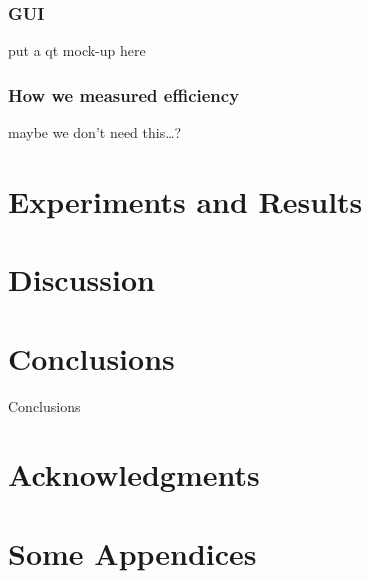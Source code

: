 \documentclass{sig-alternate-05-2015}
\begin{document}
\subsubsection{GUI}
put a qt mock-up here
\subsubsection{How we measured efficiency}
maybe we don't need this\ldots?
\section{Experiments and Results}

\section{Discussion}
\section{Conclusions}
Conclusions

\section{Acknowledgments}

%

%
%
\appendix
\section{Some Appendices}
\end{document}
